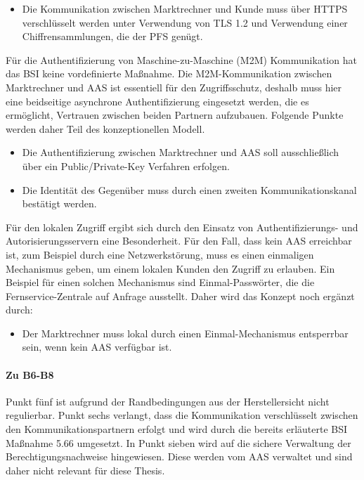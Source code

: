 \documentclass[11pt,a4paper]{report}
\begin{document}
\begin{itemize}[leftmargin=*]
\item Die Kommunikation zwischen Marktrechner und Kunde muss über HTTPS verschlüsselt werden unter Verwendung von TLS 1.2 und Verwendung einer Chiffrensammlungen, die der PFS genügt.
\end{itemize}

Für die Authentifizierung von Maschine-zu-Maschine (M2M) Kommunikation hat das BSI keine vordefinierte Maßnahme. Die M2M-Kommunikation zwischen Marktrechner und AAS ist essentiell für den Zugriffsschutz, deshalb muss hier eine beidseitige asynchrone Authentifizierung eingesetzt werden, die es ermöglicht, Vertrauen zwischen beiden Partnern aufzubauen. Folgende Punkte werden daher Teil des konzeptionellen Modell.

\begin{itemize}[leftmargin=*]
\item Die Authentifizierung zwischen Marktrechner und AAS soll ausschließlich über ein Public/Private-Key Verfahren erfolgen.
\item Die Identität des Gegenüber muss durch einen zweiten Kommunikationskanal bestätigt werden.
\end{itemize}

Für den lokalen Zugriff ergibt sich durch den Einsatz von Authentifizierungs- und Autorisierungsservern eine Besonderheit. Für den Fall, dass kein AAS erreichbar ist, zum Beispiel durch eine Netzwerkstörung, muss es einen einmaligen Mechanismus geben, um einem lokalen Kunden den Zugriff zu erlauben. Ein Beispiel für einen solchen Mechanismus sind Einmal-Passwörter, die die Fernservice-Zentrale auf Anfrage ausstellt. Daher wird das Konzept noch ergänzt durch:

\begin{itemize}[leftmargin=*]
\item Der Marktrechner muss lokal durch einen Einmal-Mechanismus entsperrbar sein, wenn kein AAS verfügbar ist.
\end{itemize}

\paragraph{Zu B6-B8} Punkt fünf ist aufgrund der Randbedingungen aus der Herstellersicht nicht regulierbar. Punkt sechs verlangt, dass die Kommunikation verschlüsselt zwischen den Kommunikationspartnern erfolgt und wird durch die bereits erläuterte BSI Maßnahme 5.66 umgesetzt. In Punkt sieben wird auf die sichere Verwaltung der Berechtigungsnachweise hingewiesen. Diese werden vom AAS verwaltet und sind daher nicht relevant für diese Thesis.
\end{document}

